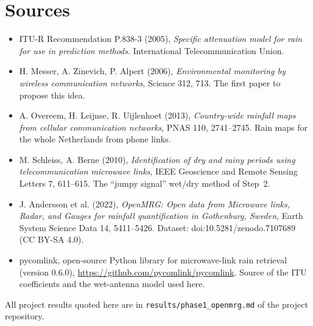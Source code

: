 \documentclass[11pt,a4paper]{article}
\begin{document}
\section{Sources}
\small
\begin{itemize}
\item ITU-R Recommendation P.838-3 (2005), \emph{Specific attenuation model for rain for use in prediction methods}. International Telecommunication Union.
\item H. Messer, A. Zinevich, P. Alpert (2006), \emph{Environmental monitoring by wireless communication networks}, Science 312, 713. The first paper to propose this idea.
\item A. Overeem, H. Leijnse, R. Uijlenhoet (2013), \emph{Country-wide rainfall maps from cellular communication networks}, PNAS 110, 2741--2745. Rain maps for the whole Netherlands from phone links.
\item M. Schleiss, A. Berne (2010), \emph{Identification of dry and rainy periods using telecommunication microwave links}, IEEE Geoscience and Remote Sensing Letters 7, 611--615. The ``jumpy signal'' wet/dry method of Step~2.
\item J. Andersson et al. (2022), \emph{OpenMRG: Open data from Microwave links, Radar, and Gauges for rainfall quantification in Gothenburg, Sweden}, Earth System Science Data 14, 5411--5426. Dataset: doi:10.5281/zenodo.7107689 (CC BY-SA 4.0).
\item pycomlink, open-source Python library for microwave-link rain retrieval (version 0.6.0), \url{https://github.com/pycomlink/pycomlink}. Source of the ITU coefficients and the wet-antenna model used here.
\end{itemize}
All project results quoted here are in \texttt{results/phase1\_openmrg.md} of the project repository.






\end{document}
